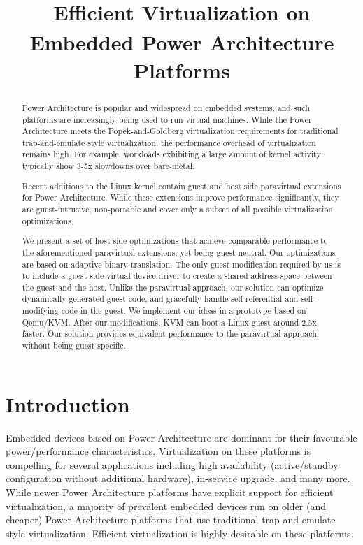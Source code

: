\documentclass[10pt,twocolumn]{article}
\begin{document}
\title{Efficient Virtualization on Embedded Power Architecture\textsuperscript{\textregistered} Platforms}
\author{}
\date{}
\maketitle
\thispagestyle{empty}

\maketitle
\begin{abstract}
  Power Architecture\textsuperscript{\textregistered} is popular and widespread on embedded systems, and such
  platforms are
  increasingly
  being used to run virtual machines\cite{embedded_virtualization, KVM_on_embedded_Power}. While the Power
  Architecture meets the
  Popek-and-Goldberg virtualization requirements for traditional trap-and-emulate
  style virtualization, the performance overhead of virtualization remains high.
  For example, workloads exhibiting a large amount of kernel activity typically
  show 3-5x slowdowns over bare-metal.

  Recent additions to the Linux kernel contain guest and host side paravirtual
  extensions for Power Architecture. While these extensions improve performance
  significantly, they
  are guest-intrusive, non-portable and cover only a subset of all possible
  virtualization optimizations.

  We present a set of host-side optimizations that achieve comparable
  performance
  to the aforementioned paravirtual extensions, yet being
  guest-neutral. Our optimizations are based on adaptive binary translation.
  The only
  guest modification required by us is to include a guest-side virtual device driver
  to create a shared address space between the guest and the host.
  Unlike the paravirtual approach,
  our solution can optimize dynamically generated guest code, and gracefully
  handle self-referential and self-modifying code in the guest.
  We implement our ideas in a prototype based on Qemu/KVM.
  After our modifications, KVM can boot a Linux guest around 2.5x faster. Our solution
  provides equivalent performance to
  the paravirtual approach, without being guest-specific.
\end{abstract}
\section{Introduction}
Embedded devices based on Power Architecture are dominant for their
favourable power/performance characteristics. Virtualization on these platforms is
compelling for several applications including high availability (active/standby
configuration without additional hardware), in-service upgrade, and many
more\cite{embedded_virtualization, KVM_on_embedded_Power}. While newer Power
Architecture platforms
have explicit support for efficient virtualization\cite{freescale_embedded_hyperv, hwassists_hyperv}, a majority of
prevalent embedded devices run on older (and cheaper) Power Architecture platforms that use
traditional trap-and-emulate style virtualization\cite{popekgoldberg}. Efficient
virtualization is highly desirable on these platforms.
\end{document}
